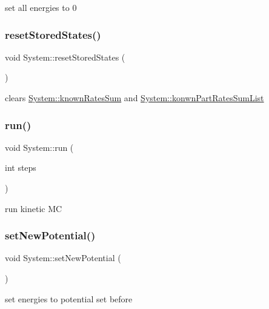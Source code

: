 set all energies to 0 \mbox{\label{classSystem_ab8fd982f98b67cb94f9cb0085b440751}} 
\subsubsection{\texorpdfstring{reset\+Stored\+States()}{resetStoredStates()}}
{\footnotesize\ttfamily void System\+::reset\+Stored\+States (\begin{DoxyParamCaption}{ }\end{DoxyParamCaption})}

clears \hyperlink{classSystem_af23703acd38834ecb9381425724f4ca5}{System\+::known\+Rates\+Sum} and \hyperlink{classSystem_a9892a3f67a51872cce3577ec50a55a5d}{System\+::konwn\+Part\+Rates\+Sum\+List} \mbox{\label{classSystem_a166f8dc2f77ff0ff2df9b25f8740a134}} 
\subsubsection{\texorpdfstring{run()}{run()}}
{\footnotesize\ttfamily void System\+::run (\begin{DoxyParamCaption}\item[{int}]{steps }\end{DoxyParamCaption})}

run kinetic MC \mbox{\label{classSystem_ad41034bcdfc24395e67fe7e3d5f50330}} 
\subsubsection{\texorpdfstring{set\+New\+Potential()}{setNewPotential()}}
{\footnotesize\ttfamily void System\+::set\+New\+Potential (\begin{DoxyParamCaption}{ }\end{DoxyParamCaption})\hspace{0.3cm}{\ttfamily [private]}}

set energies to potential set before \mbox{\label{classSystem_ac449110fcd692cdec9987730635179df}} 
